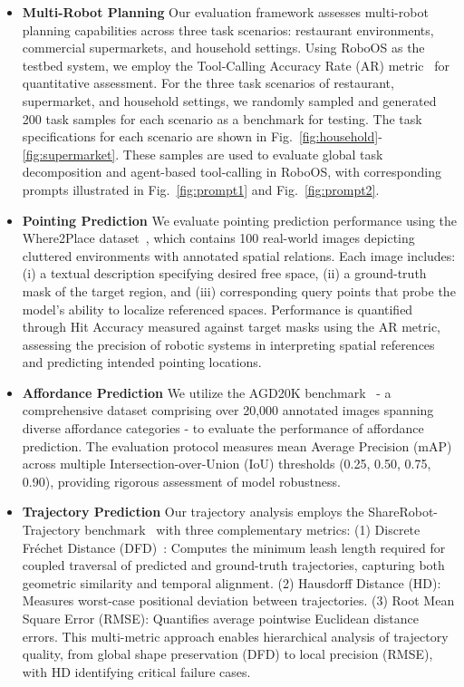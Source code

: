 \begin{itemize}[left=1em]
\item \textbf{Multi-Robot Planning} 
Our evaluation framework assesses multi-robot planning capabilities across three task scenarios: restaurant environments, commercial supermarkets, and household settings. Using RoboOS as the testbed system, we employ the Tool-Calling Accuracy Rate (AR) metric~\cite{zhang2024lmms} for quantitative assessment. For the three task scenarios of restaurant, supermarket, and household settings, we randomly sampled and generated 200 task samples for each scenario as a benchmark for testing. The task specifications for each scenario are shown in Fig.~\ref{fig:household}-\ref{fig:supermarket}. These samples are used to evaluate global task decomposition and agent-based tool-calling in RoboOS, with corresponding prompts illustrated in Fig.~\ref{fig:prompt1} and Fig.~\ref{fig:prompt2}.

\item \textbf{Pointing Prediction} 
We evaluate pointing prediction performance using the Where2Place dataset~\cite{yuan2024robopoint}, which contains 100 real-world images depicting cluttered environments with annotated spatial relations. Each image includes: (i) a textual description specifying desired free space, (ii) a ground-truth mask of the target region, and (iii) corresponding query points that probe the model's ability to localize referenced spaces. Performance is quantified through Hit Accuracy measured against target masks using the AR metric, assessing the precision of robotic systems in interpreting spatial references and predicting intended pointing locations.

\item \textbf{Affordance Prediction}
We utilize the AGD20K benchmark~\cite{luo2024grounded} - a comprehensive dataset comprising over 20,000 annotated images spanning diverse affordance categories - to evaluate the performance of affordance prediction. The evaluation protocol measures mean Average Precision (mAP) across multiple Intersection-over-Union (IoU) thresholds (0.25, 0.50, 0.75, 0.90), providing rigorous assessment of model robustness.

\item \textbf{Trajectory Prediction}
Our trajectory analysis employs the ShareRobot-Trajectory benchmark~\cite{ji2025robobrain} with three complementary metrics: 
(1) Discrete Fréchet Distance (DFD)~\cite{gu2023rt}: Computes the minimum leash length required for coupled traversal of predicted and ground-truth trajectories, capturing both geometric similarity and temporal alignment.
(2) Hausdorff Distance (HD): Measures worst-case positional deviation between trajectories.
(3) Root Mean Square Error (RMSE): Quantifies average pointwise Euclidean distance errors.
This multi-metric approach enables hierarchical analysis of trajectory quality, from global shape preservation (DFD) to local precision (RMSE), with HD identifying critical failure cases.

\end{itemize}

